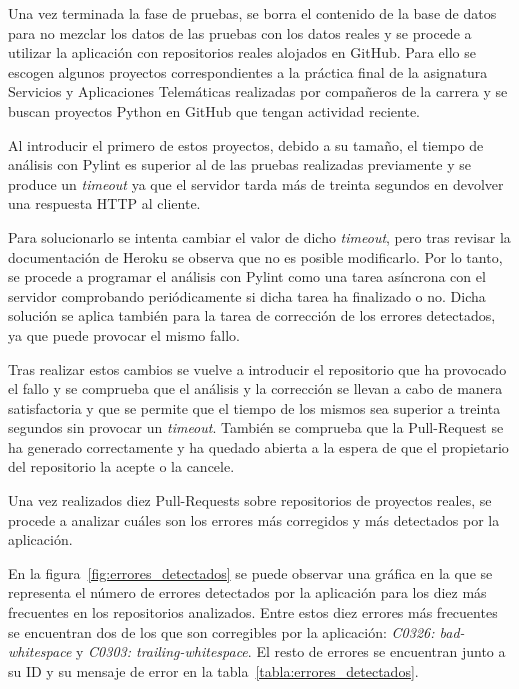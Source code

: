\documentclass[a4paper, 12pt]{book}
\begin{document}
Una vez terminada la fase de pruebas, se borra el contenido de la base de datos para no mezclar los datos de las pruebas con los datos reales y se procede a utilizar la aplicación con repositorios reales alojados en GitHub.
Para ello se escogen algunos proyectos correspondientes a la práctica final de la asignatura Servicios y Aplicaciones Telemáticas realizadas por compañeros de la carrera y se buscan proyectos Python en GitHub que tengan actividad reciente.

Al introducir el primero de estos proyectos, debido a su tamaño, el tiempo de análisis con Pylint es superior al de las pruebas realizadas previamente y se produce un \emph{timeout} ya que el servidor tarda más de treinta segundos en devolver una respuesta HTTP al cliente.

Para solucionarlo se intenta cambiar el valor de dicho \emph{timeout}, pero tras revisar la documentación de Heroku se observa que no es posible modificarlo.
Por lo tanto, se procede a programar el análisis con Pylint como una tarea asíncrona con el servidor comprobando periódicamente si dicha tarea ha finalizado o no.
Dicha solución se aplica también para la tarea de corrección de los errores detectados, ya que puede provocar el mismo fallo.

Tras realizar estos cambios se vuelve a introducir el repositorio que ha provocado el fallo y se comprueba que el análisis y la corrección se llevan a cabo de manera satisfactoria y que se permite que el tiempo de los mismos sea superior a treinta segundos sin provocar un \emph{timeout}.
También se comprueba que la Pull-Request se ha generado correctamente y ha quedado abierta a la espera de que el propietario del repositorio la acepte o la cancele.

Una vez realizados diez Pull-Requests sobre repositorios de proyectos reales, se procede a analizar cuáles son los errores más corregidos y más detectados por la aplicación.

En la figura~\ref{fig:errores_detectados} se puede observar una gráfica en la que se representa el número de errores detectados por la aplicación para los diez más frecuentes en los repositorios analizados.
Entre estos diez errores más frecuentes se encuentran dos de los que son corregibles por la aplicación: \textit{C0326: bad-whitespace} y \textit{C0303: trailing-whitespace}.
El resto de errores se encuentran junto a su ID y su mensaje de error en la tabla~\ref{tabla:errores_detectados}.
\end{document}
